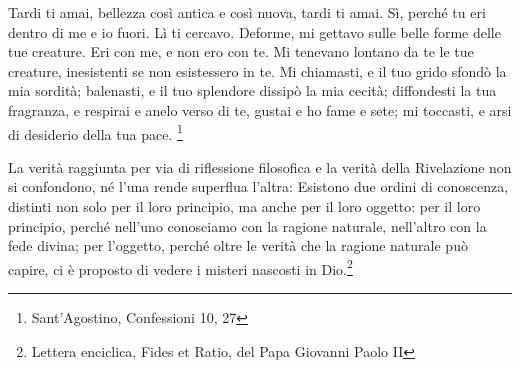 \begin{vcentered}
    Tardi ti amai, bellezza così antica e così nuova, tardi ti amai. Sì, perché tu eri dentro di me e io fuori. Lì ti cercavo. Deforme, mi gettavo sulle belle forme delle tue creature. Eri con me, e non ero con te. Mi tenevano lontano da te le tue creature, inesistenti se non esistessero in te. Mi chiamasti, e il tuo grido sfondò la mia sordità; balenasti, e il tuo splendore dissipò la mia cecità; diffondesti la tua fragranza, e respirai e anelo verso di te, gustai e ho fame e sete; mi toccasti, e arsi di desiderio della tua pace. \footnote{Sant'Agostino, Confessioni 10, 27}
\end{vcentered}

\begin{vcentered}
    La verità raggiunta per via di riflessione filosofica e la verità della Rivelazione non si confondono, né l'una rende superflua l'altra: Esistono due ordini di conoscenza, distinti non solo per il loro principio, ma anche per il loro oggetto: per il loro principio, perché nell'uno conosciamo con la ragione naturale, nell'altro con la fede divina; per l'oggetto, perché oltre le verità che la ragione naturale può capire, ci è proposto di vedere i misteri nascosti in Dio.\footnote{Lettera enciclica, Fides et Ratio, del Papa Giovanni Paolo II}
\end{vcentered}
